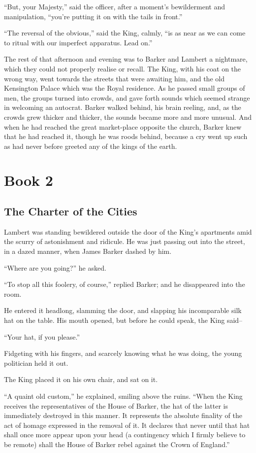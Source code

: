 \documentclass{book}
\begin{document}
“But, your Majesty,” said the officer, after a moment’s bewilderment and manipulation, “you’re putting it on with the tails in front.”

“The reversal of the obvious,” said the King, calmly, “is as near as we can come to ritual with our imperfect apparatus. Lead on.”

The rest of that afternoon and evening was to Barker and Lambert a nightmare, which they could not properly realise or recall. The King, with his coat on the wrong way, went towards the streets that were awaiting him, and the old Kensington Palace which was the Royal residence. As he passed small groups of men, the groups turned into crowds, and gave forth sounds which seemed strange in welcoming an autocrat. Barker walked behind, his brain reeling, and, as the crowds grew thicker and thicker, the sounds became more and more unusual. And when he had reached the great market-place opposite the church, Barker knew that he had reached it, though he was roods behind, because a cry went up such as had never before greeted any of the kings of the earth.

\setcounter{chapter}{0}\part*{Book 2}
\label{chapter-4}
\chapter{The Charter of the Cities}
\label{chapter-5}
Lambert was standing bewildered outside the door of the King’s apartments amid the scurry of astonishment and ridicule. He was just passing out into the street, in a dazed manner, when James Barker dashed by him.

“Where are you going?” he asked.

“To stop all this foolery, of course,” replied Barker; and he disappeared into the room.

He entered it headlong, slamming the door, and slapping his incomparable silk hat on the table. His mouth opened, but before he could speak, the King said–

“Your hat, if you please.”

Fidgeting with his fingers, and scarcely knowing what he was doing, the young politician held it out.

The King placed it on his own chair, and sat on it.

“A quaint old custom,” he explained, smiling above the ruins. “When the King receives the representatives of the House of Barker, the hat of the latter is immediately destroyed in this manner. It represents the absolute finality of the act of homage expressed in the removal of it. It declares that never until that hat shall once more appear upon your head (a contingency which I firmly believe to be remote) shall the House of Barker rebel against the Crown of England.”
\end{document}
